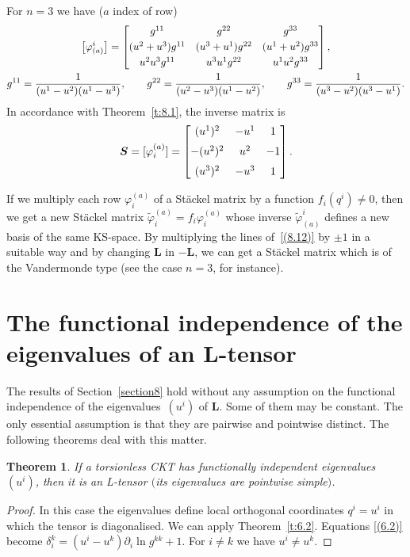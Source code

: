 \documentclass[pdftex]{sigma}
\def\bs{\boldsymbol}
\numberwithin{equation}{section}
\newtheorem{Theorem}{Theorem}[section]
 { \theoremstyle{definition}
\newtheorem{Notation}[Theorem]{Notation}
\newtheorem{Example}[Theorem]{Example}
\newtheorem{Remark}[Theorem]{Remark}
\newtheorem{Remarks}[Theorem]{Remarks}
 }
\begin{document}
For $n=3$ we have ($a$ index of row)
\begin{gather*}
\big[\varphi_{(a)}^i\big]=\bmatrix
g^{11} & g^{22} & g^{33}
\\[3pt]
(u^2+u^3)g^{11} & (u^3+u^1)g^{22} & (u^1+u^2)g^{33}
\\[3pt]
u^2u^3g^{11} & u^3u^1g^{22} & u^1u^2g^{33}
\endbmatrix,\\
g^{11}=\dfrac{1}{(u^1-u^2)(u^1-u^3)},
\qquad
g^{22}=\dfrac{1}{(u^2-u^3)(u^1-u^2)},
\qquad
g^{33}=\dfrac{1}{(u^3-u^2)(u^3-u^1)}.
\end{gather*}
In accordance with Theorem~\ref{t:8.1}, the inverse matrix is
\begin{gather*}
\bs S=[\varphi_i^{(a)}]=\bmatrix
(u^1)^2 & -u^1 & 1
\\[6pt]
- (u^2)^2 & u^2 & -1
\\[6pt]
(u^3)^2 & -u^3 & 1 \cr\endbmatrix.
\end{gather*}

\begin{Remark}  If we multiply each row $\varphi_i^{(a)}$ of a St\"ackel matrix by a function $f_i(q^i)\neq 0$, then we get a new St\"ackel matrix $\tilde\varphi_i^{(a)}=f_i\varphi_i^{(a)}$ whose inverse $\tilde\varphi^i_{(a)}$ def\/ines a new basis of the  same KS-space. By multiplying the lines of~\eqref{(8.12)} by $\pm 1$ in a suitable way and by changing $\bs L$ in $-\bs L$, we can get a St\"ackel matrix which is of the Vandermonde type (see the case $n=3$, for instance).
\end{Remark}


\section{The functional independence of the eigenvalues of an L-tensor}\label{section9}

The results of Section~\ref{section8} hold without any assumption on the functional independence of the eigen\-va\-lues~$(u^i)$ of $\bs L$. Some of them may be constant. The only essential assumption is that they are pairwise and pointwise distinct. The following theorems deal with this matter.

\begin{Theorem}\label{t:9.1}
If a torsionless CKT has functionally independent eigenvalues $(u^i)$, then it is an L-tensor $($its eigenvalues are pointwise simple$)$.
\end{Theorem}

\begin{proof}
In this case the eigenvalues def\/ine local orthogonal coordinates $q^i=u^i$ in which the tensor is diagonalised. We can apply Theorem~\ref{t:6.2}. Equations \eqref{(6.2)} become $\delta_i^k=(u^i-u^k)\partial_i\ln g^{kk}+1$. For $i\neq k$ we have $u^i\neq u^k$.
\end{proof}
\end{document}
